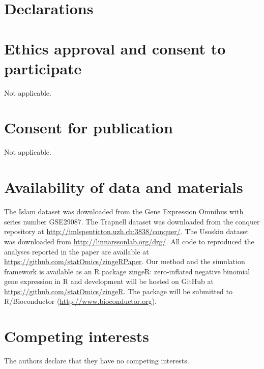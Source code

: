 \documentclass{bmcart}
\begin{document}





\begin{backmatter}
\section*{Declarations}

\section*{Ethics approval and consent to participate}
Not applicable.

\section*{Consent for publication}
Not applicable.

\section*{Availability of data and materials}
The Islam dataset was downloaded from the Gene Expression Omnibus with series number GSE29087.
The Trapnell dataset was downloaded from the conquer repository \cite{Soneson2017} at \url{http://imlspenticton.uzh.ch:3838/conquer/}.
The Usoskin dataset was downloaded from \url{http://linnarssonlab.org/drg/}.
All code to reproduced the analyses reported in the paper are available at \url{https://github.com/statOmics/zingeRPaper}.
Our method and the simulation framework is available as an R package zingeR: zero-inflated negative binomial gene expression in R and development will be hosted on GitHub at \url{https://github.com/statOmics/zingeR}.
The package will be submitted to R/Bioconductor (\url{http://www.bioconductor.org}).

\section*{Competing interests}
The authors declare that they have no competing interests.
  

\end{backmatter}
\end{document}
